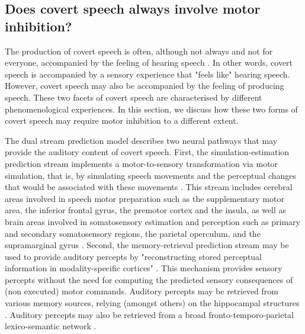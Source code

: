 \documentclass[utf8]{template/frontiersSCNS} %
\begin{document}
\subsection{Does covert speech always involve motor inhibition?}

The production of covert speech is often, although not always and not for everyone, accompanied by the feeling of hearing speech \citep{hurlburt_investigating_2011}. In other words, covert speech is accompanied by a sensory experience that "feels like" hearing speech. However, covert speech may also be accompanied by the feeling of producing speech. These two facets of covert speech are characterised by different phenomenological experiences. In this section, we discuss how these two forms of covert speech may require motor inhibition to a different extent.

The dual stream prediction model \citep{tian_mental_2012, tian_effect_2013, tian_mental_2016} describes two neural pathways that may provide the auditory content of covert speech. First, the simulation-estimation prediction stream implements a motor-to-sensory transformation via motor simulation, that is, by simulating speech movements and the perceptual changes that would be associated with these movements \citep[see also][for a similar proposal]{loevenbruck_cognitive_2018}. This stream includes cerebral areas involved in speech motor preparation such as the supplementary motor area, the inferior frontal gyrus, the premotor cortex and the insula, as well as brain areas involved in somatosensory estimation and perception such as primary and secondary somatosensory regions, the parietal operculum, and the supramarginal gyrus \citep{tian_mental_2016}. Second, the memory-retrieval prediction stream may be used to provide auditory percepts by "reconstructing stored perceptual information in modality-specific cortices" \citep{tian_mental_2016}. This mechanism provides sensory percepts without the need for computing the predicted sensory consequences of (non executed) motor commands. Auditory percepts may be retrieved from various memory sources, relying (amongst others) on the hippocampal structures \citep{tian_mental_2016}. Auditory percepts may also be retrieved from a broad fronto-temporo-parietal lexico-semantic network \citep[for more details, see][]{tian_mental_2016}.

\end{document}
